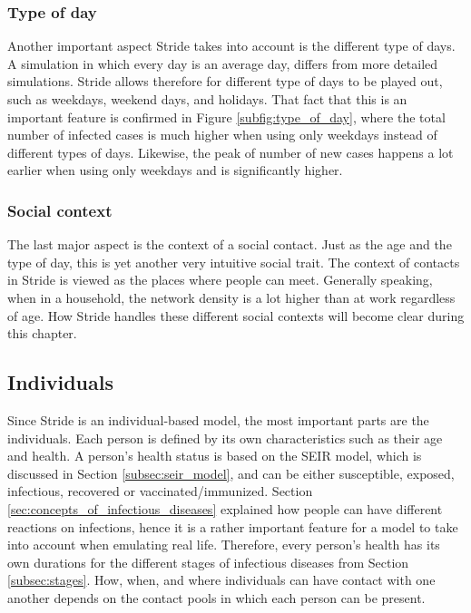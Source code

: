 \subsubsection{Type of day}
\label{subsubsec:type_of_day}
Another important aspect Stride takes into account is the different type of days. A simulation in which every day is an average day, differs from more detailed simulations. Stride allows therefore for different type of days to be played out, such as weekdays, weekend days, and holidays. That fact that this is an important feature is confirmed in Figure \ref{subfig:type_of_day}, where the total number of infected cases is much higher when using only weekdays instead of different types of days. Likewise, the peak of number of new cases happens a lot earlier when using only weekdays and is significantly higher.

\subsubsection{Social context}
\label{subsec:social_context}
The last major aspect is the context of a social contact. Just as the age and the type of day, this is yet another very intuitive social trait. The context of contacts in Stride is viewed as the places where people can meet. Generally speaking, when in a household, the network density is a lot higher than at work regardless of age. How Stride handles these different social contexts will become clear during this chapter.

\subsection{Individuals}
\label{subsec:individuals}
Since Stride is an individual-based model, the most important parts are the individuals. Each person is defined by its own characteristics such as their age and health. A person's health status is based on the SEIR model, which is discussed in Section \ref{subsec:seir_model}, and can be either susceptible, exposed, infectious, recovered or vaccinated/immunized. Section \ref{sec:concepts_of_infectious_diseases} explained how people can have different reactions on infections, hence it is a rather important feature for a model to take into account when emulating real life. Therefore, every person's health has its own durations for the different stages of infectious diseases from Section \ref{subsec:stages}. How, when, and where individuals can have contact with one another depends on the contact pools in which each person can be present.

